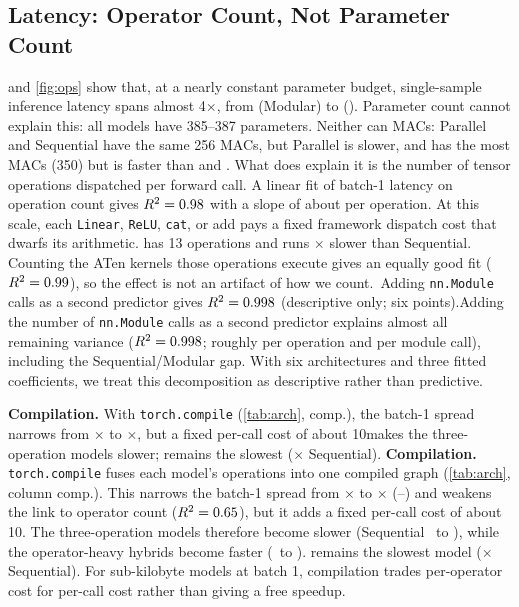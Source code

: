 \subsection{Latency: Operator Count, Not Parameter Count}
\label{sec:res-latency}
 and \cref{fig:ops} show that, at a nearly constant parameter budget, single-sample inference
latency spans almost 4$\times$, from \latOneModular\us (Modular) to \latOneHB\us (\HB). Parameter count
cannot explain this: all models have 385--387 parameters. Neither can MACs: Parallel and Sequential have the
same 256 MACs, but Parallel is slower, and \HC has the most MACs (350) but is faster than \HA and \HB. What does
explain it is the number of tensor operations dispatched per forward call. A linear fit of batch-1 latency on
operation count gives $R^2=0.98$ with a slope of about \opsFitSlope\us per operation. At this scale, each
\texttt{Linear}, \texttt{ReLU}, \texttt{cat}, or add pays a fixed framework dispatch cost that dwarfs its
arithmetic. \HB has 13 operations and runs \latOneRatioHB$\times$ slower than Sequential. Counting the ATen
kernels those operations execute gives an equally good fit ($R^2=0.99$), so the effect is not an artifact
of how we count.\ifcompact\ Adding \texttt{nn.Module} calls as a second predictor gives $R^2=0.998$ (descriptive only;
six points).\else Adding the number of \texttt{nn.Module} calls as a second predictor explains almost all
remaining variance ($R^2=0.998$; roughly \perOpUs\us per operation and \perModUs\us per module call),
including the Sequential/Modular gap. With six architectures and three fitted coefficients, we treat this
decomposition as descriptive rather than predictive.\fi

\ifcompact
\textbf{Compilation.} With \texttt{torch.compile} (\cref{tab:arch}, comp.), the batch-1 spread narrows from
\eagerSpread$\times$ to \compSpread$\times$, but a fixed per-call cost of about 10\us makes the three-operation models slower;
\HB remains the slowest (\compRatioHB$\times$ Sequential).
\else
\textbf{Compilation.} \texttt{torch.compile} fuses each model's operations into one compiled graph (\cref{tab:arch},
column comp.). This narrows the batch-1 spread from \eagerSpread$\times$ to \compSpread$\times$
(\compModular--\compHB\us) and weakens the link to operator count ($R^2=0.65$), but it adds a fixed per-call
cost of about 10\us. The three-operation models therefore become slower (Sequential \latOneSequential\ to
\compSequential\us), while the operator-heavy hybrids become faster (\HA \latOneHA\ to \compHA\us). \HB remains the
slowest model (\compRatioHB$\times$ Sequential). For sub-kilobyte models at batch 1, compilation trades per-operator
cost for per-call cost rather than giving a free speedup.
\fi


